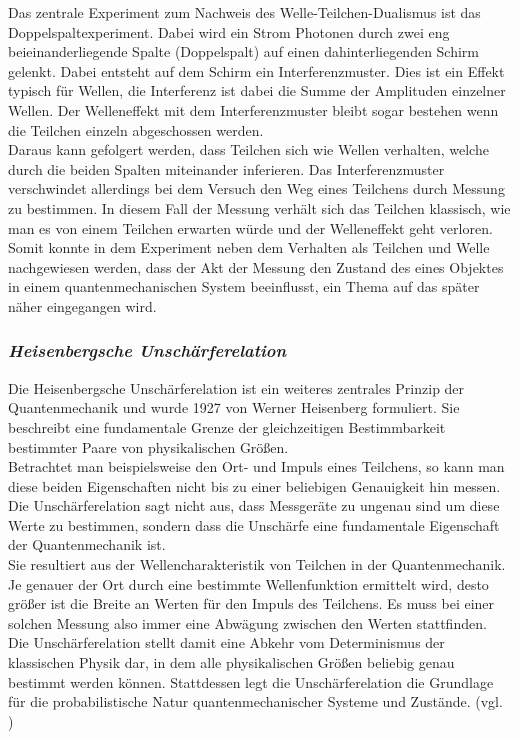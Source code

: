 Das zentrale Experiment zum Nachweis des Welle-Teilchen-Dualismus ist das Doppelspaltexperiment. Dabei wird ein Strom Photonen durch zwei eng beieinanderliegende Spalte (Doppelspalt) auf einen dahinterliegenden Schirm gelenkt. Dabei entsteht auf dem Schirm ein Interferenzmuster. Dies ist ein Effekt typisch für  Wellen, die Interferenz ist dabei die Summe der Amplituden einzelner Wellen. Der Welleneffekt mit dem Interferenzmuster bleibt sogar bestehen wenn die Teilchen einzeln abgeschossen werden.\\
Daraus kann gefolgert werden, dass Teilchen sich wie Wellen verhalten, welche durch die beiden Spalten miteinander inferieren. Das Interferenzmuster verschwindet allerdings bei dem Versuch den Weg eines Teilchens durch Messung zu bestimmen. In diesem Fall der Messung verhält sich das Teilchen klassisch, wie man es von einem Teilchen erwarten würde und der Welleneffekt geht verloren.\\
Somit konnte in dem Experiment neben dem Verhalten als Teilchen und Welle nachgewiesen werden, dass der Akt der Messung den Zustand des eines Objektes in einem quantenmechanischen System beeinflusst, ein Thema auf das später näher eingegangen wird.

\subsubsection*{\textit{Heisenbergsche Unschärferelation}}
\label{Heisenbergsche Unschärferelation}

Die Heisenbergsche Unschärferelation ist ein weiteres zentrales Prinzip der Quantenmechanik und wurde 1927 von Werner Heisenberg formuliert. Sie beschreibt eine fundamentale Grenze der gleichzeitigen Bestimmbarkeit bestimmter Paare von physikalischen Größen.\\
Betrachtet man beispielsweise den Ort- und Impuls eines Teilchens, so kann man diese beiden Eigenschaften nicht bis zu einer beliebigen Genauigkeit hin messen. Die Unschärferelation sagt nicht aus, dass Messgeräte zu ungenau sind um diese Werte zu bestimmen, sondern dass die Unschärfe eine fundamentale Eigenschaft der Quantenmechanik ist.\\
Sie resultiert aus der Wellencharakteristik von Teilchen in der Quantenmechanik. Je genauer der Ort durch eine bestimmte Wellenfunktion ermittelt wird, desto größer ist die Breite an Werten für den Impuls des Teilchens. Es muss bei einer solchen Messung also immer eine Abwägung zwischen den Werten stattfinden. \\
Die Unschärferelation stellt damit eine Abkehr vom Determinismus der klassischen Physik dar, in dem alle physikalischen Größen beliebig genau bestimmt werden können. Stattdessen legt die Unschärferelation die Grundlage für die probabilistische Natur quantenmechanischer Systeme und Zustände. (vgl. \cite[Ch. 1.6.3]{kasirajan_fundamentals_2021})

